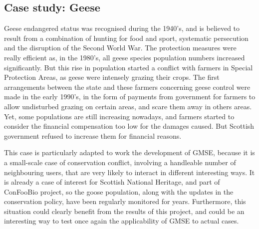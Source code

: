 \documentclass[12pt,a4paper]{article}
\begin{document}
\subsection{Case study: Geese}

Geese endangered status was recognised during the 1940's, and is believed to result from a combination of hunting for food and sport, systematic persecution and the disruption of the Second World War.
The protection measures were really efficient as, in the 1980's, all geese species population numbers increased significantly.
But this rise in population started a conflict with farmers in Special Protection Areas, as geese were intensely grazing their crops.
The first arrangements between the state and these farmers concerning geese control were made in the early 1990's, in the form of payments from government for farmers to allow undisturbed grazing on certain areas, and scare them away in others areas.
Yet, some populations are still increasing nowadays, and farmers started to consider the financial compensation too low for the damages caused.
But Scottish government refused to increase them for financial reasons.

This case is particularly adapted to work the development of GMSE, because it is a small-scale case of conservation conflict, involving a handleable number of neighbouring users, that are very likely to interact in different interesting ways.
It is already a case of interest for Scottish National Heritage, and part of ConFooBio project, so the goose population, along with the updates in the conservation policy, have been regularly monitored for years.
Furthermore, this situation could clearly benefit from the results of this project, and could be an interesting way to test once again the applicability of GMSE to actual cases.
\end{document}
